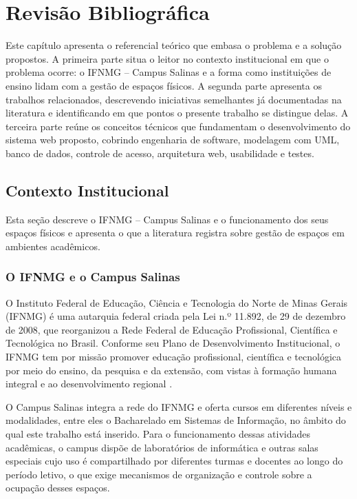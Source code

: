 \documentclass[
	12pt,				%
	twoside,			%
	openany,			%
	a4paper,			%
	chapter=TITLE,		%
	section=TITLE,		%
	subsection=TITLE,	%
	subsubsection=TITLE,%
	english,			%
	french,				%
	spanish,			%
	brazil,				%
	]{abntex2}
\begin{document}
\section{Revisão Bibliográfica}
\label{sec:revbib}

Este capítulo apresenta o referencial teórico que embasa o problema e a solução propostos. A primeira parte situa o leitor no contexto institucional em que o problema ocorre: o IFNMG -- Campus Salinas e a forma como instituições de ensino lidam com a gestão de espaços físicos. A segunda parte apresenta os trabalhos relacionados, descrevendo iniciativas semelhantes já documentadas na literatura e identificando em que pontos o presente trabalho se distingue delas. A terceira parte reúne os conceitos técnicos que fundamentam o desenvolvimento do sistema web proposto, cobrindo engenharia de software, modelagem com UML, banco de dados, controle de acesso, arquitetura web, usabilidade e testes.

\subsection{Contexto Institucional}
\label{sec:contexto}

Esta seção descreve o IFNMG -- Campus Salinas e o funcionamento dos seus espaços físicos e apresenta o que a literatura registra sobre gestão de espaços em ambientes acadêmicos.

\subsubsection{O IFNMG e o Campus Salinas}
\label{sec:ifnmg}

O Instituto Federal de Educação, Ciência e Tecnologia do Norte de Minas Gerais (IFNMG) é uma autarquia federal criada pela Lei n.º 11.892, de 29 de dezembro de 2008, que reorganizou a Rede Federal de Educação Profissional, Científica e Tecnológica no Brasil. Conforme seu Plano de Desenvolvimento Institucional, o IFNMG tem por missão promover educação profissional, científica e tecnológica por meio do ensino, da pesquisa e da extensão, com vistas à formação humana integral e ao desenvolvimento regional \cite{ifnmg2024pdi}.

O Campus Salinas integra a rede do IFNMG e oferta cursos em diferentes níveis e modalidades, entre eles o Bacharelado em Sistemas de Informação, no âmbito do qual este trabalho está inserido. Para o funcionamento dessas atividades acadêmicas, o campus dispõe de laboratórios de informática e outras salas especiais cujo uso é compartilhado por diferentes turmas e docentes ao longo do período letivo, o que exige mecanismos de organização e controle sobre a ocupação desses espaços.
\end{document}
